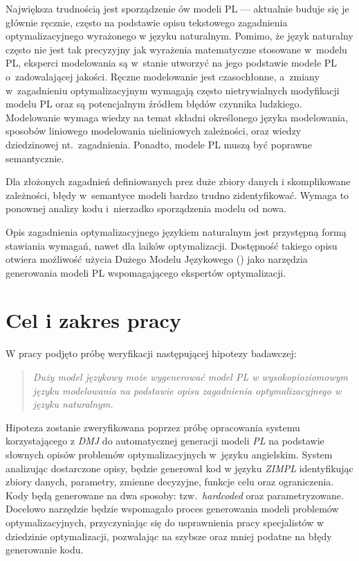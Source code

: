 Największa trudnością jest sporządzenie ów modeli PL --- aktualnie buduje się je głównie ręcznie, często na podstawie opisu tekstowego zagadnienia optymalizacyjnego wyrażonego w języku naturalnym.  Pomimo, że język naturalny często nie jest tak precyzyjny jak wyrażenia matematyczne stosowane w~modelu PL, eksperci modelowania są w~stanie utworzyć na jego podstawie modele PL o~zadowalającej jakości.
Ręczne modelowanie jest czasochłonne, a~zmiany w~zagadnieniu optymalizacyjnym wymagają często nietrywialnych modyfikacji modelu PL oraz są potencjalnym źródłem błędów czynnika ludzkiego. Modelowanie wymaga wiedzy na temat składni określonego języka modelowania, sposobów liniowego modelowania nieliniowych zależności, oraz wiedzy dziedzinowej nt.~zagadnienia.
Ponadto, modele PL muszą być poprawne semantycznie. 

Dla złożonych zagadnień definiowanych prez duże zbiory danych i skomplikowane zależności, błędy w~semantyce modeli bardzo trudno zidentyfikować. Wymaga to ponownej analizy kodu i~nierzadko sporządzenia modelu od nowa.

Opis zagadnienia optymalizacyjnego językiem naturalnym jest przystępną formą stawiania wymagań, nawet dla laików optymalizacji. Dostępność takiego opisu otwiera możliwość użycia Dużego Modelu Językowego ()  \cite{brown2020language} jako narzędzia generowania modeli PL wspomagającego ekspertów optymalizacji.

\section{Cel i zakres pracy}\label{sec:intro:aim}

W pracy podjęto próbę weryfikacji następującej hipotezy badawczej:
\begin{quote}
\textit{Duży model językowy może wygenerować model PL w wysokopioziomowym języku modelowania na podstawie opisu zagadnienia optymalizacyjnego w języku naturalnym.}
\end{quote}

Hipoteza zostanie zweryfikowana poprzez próbę opracowania systemu korzystającego z \textit{DMJ} do automatycznej generacji modeli \textit{PL} na podstawie słownych opisów problemów optymalizacyjnych w~języku angielskim. System analizując dostarczone opisy, będzie generował kod w języku \textit{ZIMPL} identyfikując zbiory danych, parametry, zmienne decyzyjne, funkcje celu oraz ograniczenia. Kody będą generowane na dwa sposoby: tzw.~\textit{hardcoded} oraz parametryzowane. Docelowo narzędzie będzie wspomagało proces generowania modeli problemów optymalizacyjnych, przyczyniając się do usprawnienia pracy specjalistów w dziedzinie optymalizacji, pozwalając na szybsze oraz mniej podatne na błędy generowanie kodu.


